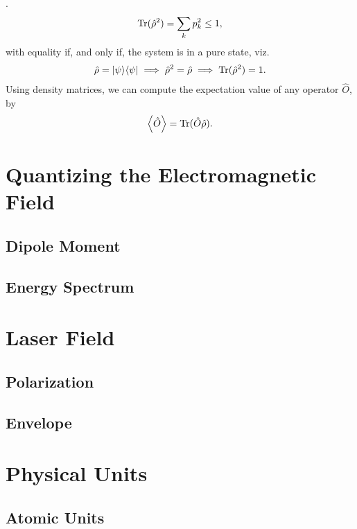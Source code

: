         \cite{modern-qm}.
        \begin{align}
            \operatorname{Tr}(\hat{\rho}^2) = \sum_{k} p_k^2 \leq 1,
        \end{align}
        with equality if, and only if, the system is in a pure state, viz.
        \begin{align}
            \hat{\rho} = | \psi \rangle\langle \psi |
            \implies \hat{\rho}^2 = \hat{\rho}
            \implies \operatorname{Tr}(\hat{\rho}^2) = 1.
        \end{align}
        Using density matrices, we can compute the expectation value of any
        operator $\hat{O}$, by \cite{modern-qm}
        \begin{align}
            \left\langle \hat{O} \right\rangle = \operatorname{Tr}(\hat{O}\hat{\rho}).
        \end{align}

    \section{Quantizing the Electromagnetic Field}
        \subsection{Dipole Moment}
        \subsection{Energy Spectrum}

    \section{Laser Field}
        \subsection{Polarization}
        \subsection{Envelope}

    \section{Physical Units}
        \subsection{Atomic Units}
